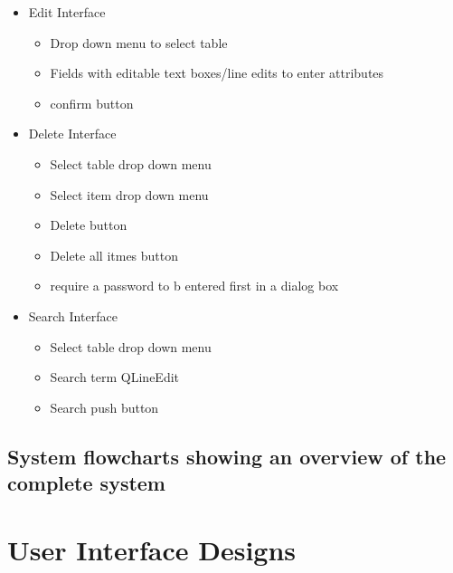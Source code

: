 \begin {itemize}
\begin {itemize}
\begin {itemize}
	\begin {itemize}
		\item Drop down menu to select table
		\item Fields with editable text boxes/line edits to enter attributes
		\item confirm button
	\end {itemize}
	\item Edit Interface
    \begin {itemize}
		\item Drop down menu to select table
		\item Fields with editable text boxes/line edits to enter attributes
		\item confirm button
	\end {itemize}
	\item Delete Interface
	\begin {itemize}
		\item Select table drop down menu
		\item Select item drop down menu
		\item Delete button
		\item Delete all itmes button
		\item require a password to b entered first in a dialog box
	\end {itemize}
	\item Search Interface
	\begin {itemize}
		\item Select table drop down menu
		\item Search term QLineEdit
		\item Search push button
	\end {itemize}	
	\end {itemize}
	\end {itemize}
\end {itemize}

\subsection{System flowcharts showing an overview of the complete system}

\section{User Interface Designs}

